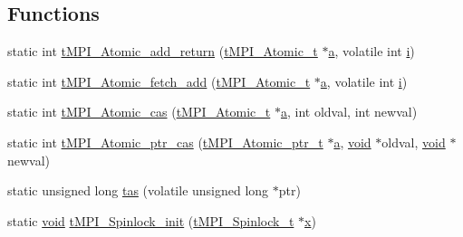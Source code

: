 \subsection*{\-Functions}
\begin{DoxyCompactItemize}
\item 
static int \hyperlink{include_2thread__mpi_2atomic_2suncc-sparc_8h_a6ceb01ee4b7be348a054f89eef35cb32}{t\-M\-P\-I\-\_\-\-Atomic\-\_\-add\-\_\-return} (\hyperlink{include_2thread__mpi_2atomic_2gcc_8h_a2c33794dc540e3b07cffc1f81a3fe4b4}{t\-M\-P\-I\-\_\-\-Atomic\-\_\-t} $\ast$\hyperlink{share_2template_2gromacs_2gmx__lapack_8h_a0880879736d1ab747a972d1942421886}{a}, volatile int \hyperlink{share_2template_2gromacs_2gmx__lapack_8h_a3c7542401c1cb8bd37ef5e7d9eb0f5a8}{i})
\item 
static int \hyperlink{include_2thread__mpi_2atomic_2suncc-sparc_8h_a09aacccd7fa0170f90856714a40c2a5a}{t\-M\-P\-I\-\_\-\-Atomic\-\_\-fetch\-\_\-add} (\hyperlink{include_2thread__mpi_2atomic_2gcc_8h_a2c33794dc540e3b07cffc1f81a3fe4b4}{t\-M\-P\-I\-\_\-\-Atomic\-\_\-t} $\ast$\hyperlink{share_2template_2gromacs_2gmx__lapack_8h_a0880879736d1ab747a972d1942421886}{a}, volatile int \hyperlink{share_2template_2gromacs_2gmx__lapack_8h_a3c7542401c1cb8bd37ef5e7d9eb0f5a8}{i})
\item 
static int \hyperlink{include_2thread__mpi_2atomic_2suncc-sparc_8h_a31f290e3623634761306d9ea0e413c7e}{t\-M\-P\-I\-\_\-\-Atomic\-\_\-cas} (\hyperlink{include_2thread__mpi_2atomic_2gcc_8h_a2c33794dc540e3b07cffc1f81a3fe4b4}{t\-M\-P\-I\-\_\-\-Atomic\-\_\-t} $\ast$\hyperlink{share_2template_2gromacs_2gmx__lapack_8h_a0880879736d1ab747a972d1942421886}{a}, int oldval, int newval)
\item 
static int \hyperlink{include_2thread__mpi_2atomic_2suncc-sparc_8h_a93c275574896fdd671df8a909d9feb37}{t\-M\-P\-I\-\_\-\-Atomic\-\_\-ptr\-\_\-cas} (\hyperlink{include_2thread__mpi_2atomic_2gcc_8h_a4c91c0105f1c0a5f23bc4239274291eb}{t\-M\-P\-I\-\_\-\-Atomic\-\_\-ptr\-\_\-t} $\ast$\hyperlink{share_2template_2gromacs_2gmx__lapack_8h_a0880879736d1ab747a972d1942421886}{a}, \hyperlink{nbnxn__kernel__simd__4xn__outer_8h_a8dc3f4a797ed992dff49d2fa3477eee8}{void} $\ast$oldval, \hyperlink{nbnxn__kernel__simd__4xn__outer_8h_a8dc3f4a797ed992dff49d2fa3477eee8}{void} $\ast$newval)
\item 
static unsigned long \hyperlink{include_2thread__mpi_2atomic_2suncc-sparc_8h_a8a6227274795631e6766287e0ebe9751}{tas} (volatile unsigned long $\ast$ptr)
\item 
static \hyperlink{nbnxn__kernel__simd__4xn__outer_8h_a8dc3f4a797ed992dff49d2fa3477eee8}{void} \hyperlink{include_2thread__mpi_2atomic_2suncc-sparc_8h_a43bcfcb921d49a8a459787430b948727}{t\-M\-P\-I\-\_\-\-Spinlock\-\_\-init} (\hyperlink{structtMPI__Spinlock__t}{t\-M\-P\-I\-\_\-\-Spinlock\-\_\-t} $\ast$\hyperlink{share_2template_2gromacs_2gmx__lapack_8h_a36b8fb392443aff4dd09ac968a2acfe8}{x})

\end{DoxyCompactItemize}
